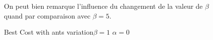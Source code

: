 \begin{figure}[H]
\begin{minipage}[t]{0.5\linewidth}
\caption{Best Cost with ants variation$ \beta=1$ $ \alpha=0 $}
\label{fig:exp_alpha_0_beta_1_AS_BestCost_n_Ants}
\end{minipage}
On peut bien remarque l'influence du changement de la valeur de $ \beta $ quand par comparaison avec $ \beta=5 $.
\end{figure}